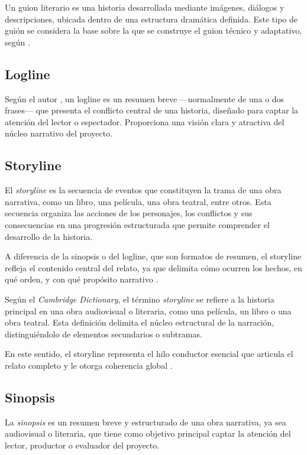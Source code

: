 \documentclass[12pt]{article}
\begin{document}
	Un guion literario es una historia desarrollada mediante imágenes, diálogos y descripciones, ubicada dentro de una estructura dramática definida. Este tipo de guión se considera la base sobre la que se construye el guion técnico y adaptativo, según \textcite{field2005}.

	\subsection{Logline}

	Según el autor \textcite{snyder2005}, un logline es un resumen breve —normalmente de una o dos frases— que presenta el conflicto central de una historia, diseñado para captar la atención del lector o espectador. Proporciona una visión clara y atractiva del núcleo narrativo del proyecto.

	\subsection{Storyline}

	El \textit{storyline} es la secuencia de eventos que constituyen la trama de una obra narrativa, como un libro, una película, una obra teatral, entre otros. Esta secuencia organiza las acciones de los personajes, los conflictos y sus consecuencias en una progresión estructurada que permite comprender el desarrollo de la historia.

	A diferencia de la sinopsis o del logline, que son formatos de resumen, el storyline refleja el contenido central del relato, ya que delimita cómo ocurren los hechos, en qué orden, y con qué propósito narrativo \parencite{cambridge_storyline}.

	Según el \textit{Cambridge Dictionary}, el término \textit{storyline} se refiere a la historia principal en una obra audiovisual o literaria, como una película, un libro o una obra teatral. Esta definición delimita el núcleo estructural de la narración, distinguiéndolo de elementos secundarios o subtramas.

	En este sentido, el storyline representa el hilo conductor esencial que articula el relato completo y le otorga coherencia global \parencite{cambridge_storyline}.

	\subsection{Sinopsis}

	La \textit{sinopsis} es un resumen breve y estructurado de una obra narrativa, ya sea audiovisual o literaria, que tiene como objetivo principal captar la atención del lector, productor o evaluador del proyecto.
\end{document}

